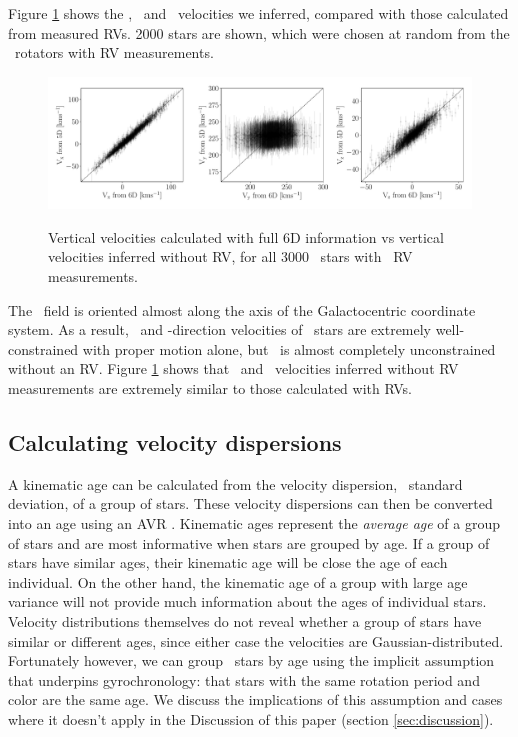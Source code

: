 Figure \ref{fig:v_comparison} shows the \vx, \vy\ and \vz\ velocities we
inferred, compared with those calculated from measured RVs.
2000 stars are shown, which were chosen at random from the \kepler\ rotators
with RV measurements.
\begin{figure}[ht!]
\caption{Vertical velocities calculated with full 6D information vs vertical
    velocities inferred without RV, for all 3000 \mct\ stars with \gaia\ RV
    measurements.}
  \centering
    \includegraphics[width=1\textwidth]{v_comparison}
\label{fig:v_comparison}
\end{figure}
The \kepler\ field is oriented almost along the \y\-axis of the Galactocentric
coordinate system.
As a result, \x\ and \z-direction velocities of \kepler\ stars are extremely
well-constrained with proper motion alone, but \vy\ is almost completely
unconstrained without an RV.
Figure \ref{fig:v_comparison} shows that \vx\ and \vz\ velocities inferred
without RV measurements are extremely similar to those calculated with RVs.

\subsection{Calculating velocity dispersions}
\label{sec:velocity_dispersion}

A kinematic age can be calculated from the velocity dispersion, \ie\ standard
deviation, of a group of stars.
These velocity dispersions can then be converted into an age using an AVR
\citep[\eg][]{holmberg2009, yu2018}.
Kinematic ages represent the {\it average age} of a group of stars and are
most informative when stars are grouped by age.
If a group of stars have similar ages, their kinematic age will be close
the age of each individual.
On the other hand, the kinematic age of a group with large age variance will
not provide much information about the ages of individual stars.
Velocity distributions themselves do not reveal whether a group of stars have
similar or different ages, since either case the velocities are
Gaussian-distributed.
Fortunately however, we can group \kepler\ stars by age using the implicit
assumption that underpins gyrochronology: that stars with the same rotation
period and color are the same age.
We discuss the implications of this assumption and cases where it doesn't
apply in the Discussion of this paper (section \ref{sec:discussion}).

